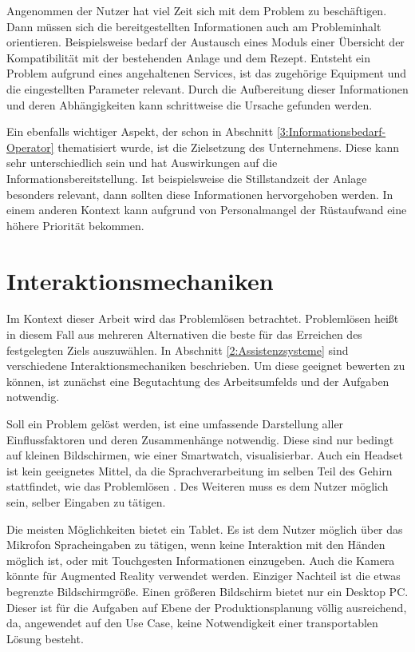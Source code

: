 Angenommen der Nutzer hat viel Zeit sich mit dem Problem zu beschäftigen. Dann müssen sich die bereitgestellten Informationen auch am Probleminhalt orientieren. Beispielsweise bedarf der Austausch eines Moduls einer Übersicht der Kompatibilität mit der bestehenden Anlage und dem Rezept. Entsteht ein Problem aufgrund eines angehaltenen Services, ist das zugehörige Equipment und die eingestellten Parameter relevant. Durch die Aufbereitung dieser Informationen und deren Abhängigkeiten kann schrittweise die Ursache gefunden werden.

Ein ebenfalls wichtiger Aspekt, der schon in Abschnitt \ref{3:Informationsbedarf-Operator} thematisiert wurde, ist die Zielsetzung des Unternehmens. Diese kann sehr unterschiedlich sein und hat Auswirkungen auf die Informationsbereitstellung. Ist beispielsweise die Stillstandzeit der Anlage besonders relevant, dann sollten diese Informationen hervorgehoben werden. In einem anderen Kontext kann aufgrund von Personalmangel der Rüstaufwand eine höhere Priorität bekommen.

\section{Interaktionsmechaniken}
Im Kontext dieser Arbeit wird das Problemlösen betrachtet. Problemlösen heißt in diesem Fall aus mehreren Alternativen die beste für das Erreichen des festgelegten Ziels auszuwählen. In Abschnitt \ref{2:Assistenzsysteme} sind verschiedene Interaktionsmechaniken beschrieben. Um diese geeignet bewerten zu können, ist zunächst eine Begutachtung des Arbeitsumfelds und der Aufgaben notwendig.

Soll ein Problem gelöst werden, ist eine umfassende Darstellung aller Einflussfaktoren und deren Zusammenhänge notwendig. Diese sind nur bedingt auf kleinen Bildschirmen, wie einer Smartwatch, visualisierbar. Auch ein Headset ist kein geeignetes Mittel, da die Sprachverarbeitung im selben Teil des Gehirn stattfindet, wie das Problemlösen \cite{Zuhlke2012}. Des Weiteren muss es dem Nutzer möglich sein, selber Eingaben zu tätigen. 

Die meisten Möglichkeiten bietet ein Tablet. Es ist dem Nutzer möglich über das Mikrofon Spracheingaben zu tätigen, wenn keine Interaktion mit den Händen möglich ist, oder mit Touchgesten Informationen einzugeben. Auch die Kamera könnte für Augmented Reality verwendet werden. Einziger Nachteil ist die etwas begrenzte Bildschirmgröße. Einen größeren Bildschirm bietet nur ein Desktop PC. Dieser ist für die Aufgaben auf Ebene der Produktionsplanung völlig ausreichend, da, angewendet auf den Use Case, keine Notwendigkeit einer transportablen Lösung besteht.

